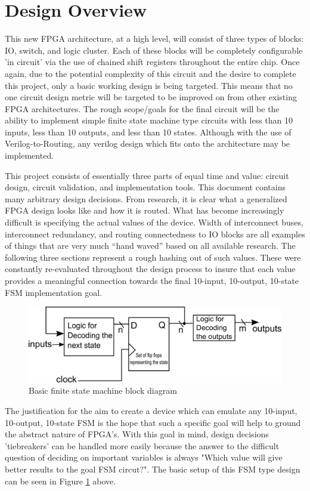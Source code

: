 \documentclass[12pt]{article}
\begin{document}
\newpage
\section{Design Overview}

This new FPGA architecture, at a high level, will consist of three types of blocks:
IO, switch, and logic cluster. Each of these blocks will be completely configurable 'in circuit'
via the use of chained shift registers throughout the entire chip. Once again, due 
to the potential complexity of this circuit and the desire to complete this project,
only a basic working design is being targeted. This means that no one circuit design
metric will be targeted to be improved on from other existing FPGA architectures.
The rough scope/goals for the final circuit will be the ability to implement simple
finite state machine type circuits with less than 10 inputs, less than 10 outputs, and
less than 10 states. Although with the use of Verilog-to-Routing, any verilog design
which fits onto the architecture may be implemented.

This project consists of essentially three parts of equal time and value: circuit 
design, circuit validation, and implementation tools. This document contains many 
arbitrary design decisions. From research, it is clear what a generalized FPGA design 
looks like and how it is routed. What has become increasingly difficult is specifying 
the actual values of the device. Width of interconnect buses, interconnect redundancy,
and routing connectedness to IO blocks are all examples of things that are very 
much “hand waved” based on all available research. The following three 
sections represent a rough hashing out of such values. These were constantly 
re-evaluated throughout the design process to insure that each value provides a meaningful 
connection towards the final 10-input, 10-output, 10-state FSM implementation goal.

\begin{figure}[ht]
  \centering
  \includegraphics[width=.7\textwidth]{fsm}
  \caption{Basic finite state machine block diagram \cite{fsm}}
  \label{fig:fsm}
\end{figure}

The justification for the aim to create a device which can emulate any 10-input, 10-output,
10-state FSM is the hope that such a specific goal will help to ground the abstract
nature of FPGA's. With this goal in mind, design decisions 'tiebreakers' can be
handled more easily because the answer to the difficult question of deciding on important
variables is always "Which value will give better results to the goal FSM circut?".
The basic setup of this FSM type design can be seen in Figure \ref{fig:fsm} above.
\end{document}
